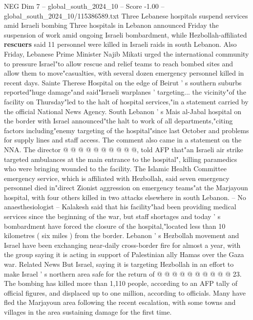 \begin{textsample}{NEG Dim 7 – global\_south\_2024\_10 – Score -1.00 – global\_south\_2024\_10/115386589.txt}  \label{ex:f7_neg_234}
Three Lebanese hospitals suspend services amid Israeli bombing Three hospitals in Lebanon announced Friday the suspension of work amid ongoing Israeli bombardment, while Hezbollah-affiliated \textbf{rescuers} said 11 personnel were killed in Israeli raids in south Lebanon.
Also Friday, Lebanese Prime Minister Najib Mikati urged the international community to pressure Israel"to allow rescue and relief teams to reach bombed sites and allow them to move"casualties, with several dozen emergency personnel killed in recent days.
Sainte Therese Hospital on the edge of Beirut ' s southern suburbs reported"huge damage"and said"Israeli warplanes ' targeting... the vicinity"of the facility on Thursday"led to the halt of hospital services,"in a statement carried by the official National News Agency.
South Lebanon ' s Mais al-Jabal hospital on the border with Israel announced"the halt to work of all departments,"citing factors including"enemy targeting of the hospital"since last October and problems for supply lines and staff access.
The comment also came in a statement on the NNA.
The director @ @ @ @ @ @ @ @ @ @, told AFP that"an Israeli air strike targeted ambulances at the main entrance to the hospital", killing paramedics who were bringing wounded to the facility.
The Islamic Health Committee emergency service, which is affiliated with Hezbollah, said seven emergency personnel died in"direct Zionist aggression on emergency teams"at the Marjayoun hospital, with four others killed in two attacks elsewhere in south Lebanon. -- No anaesthesiologist -- Kalakesh said that his facility"had been providing medical services since the beginning of the war, but staff shortages and today ' s bombardment have forced the closure of the hospital,"located less than 10 kilometres ( six miles ) from the border.
Lebanon ' s Hezbollah movement and Israel have been exchanging near-daily cross-border fire for almost a year, with the group saying it is acting in support of Palestinian ally Hamas over the Gaza war.
Related News But Israel, saying it is targeting Hezbollah in an effort to make Israel ' s northern area safe for the return of @ @ @ @ @ @ @ @ @ @ 23.
The bombing has killed more than 1,110 people, according to an AFP tally of official figures, and displaced up to one million, according to officials.
Many have fled the Marjayoun area following the recent escalation, with some towns and villages in the area sustaining damage for the first time.

\end{textsample}
